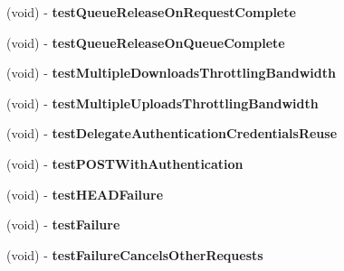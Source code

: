 \begin{DoxyCompactItemize}
\item 
\hypertarget{interface_a_s_i_network_queue_tests_a6ebc6405b8f6639be717def3dcbcd617}{
(void) -\/ {\bfseries test\-Queue\-Release\-On\-Request\-Complete}}
\label{interface_a_s_i_network_queue_tests_a6ebc6405b8f6639be717def3dcbcd617}

\item 
\hypertarget{interface_a_s_i_network_queue_tests_a8367da7729b914e691602cbfbb0cd4d6}{
(void) -\/ {\bfseries test\-Queue\-Release\-On\-Queue\-Complete}}
\label{interface_a_s_i_network_queue_tests_a8367da7729b914e691602cbfbb0cd4d6}

\item 
\hypertarget{interface_a_s_i_network_queue_tests_afecabb41732addf7e0b63960536af284}{
(void) -\/ {\bfseries test\-Multiple\-Downloads\-Throttling\-Bandwidth}}
\label{interface_a_s_i_network_queue_tests_afecabb41732addf7e0b63960536af284}

\item 
\hypertarget{interface_a_s_i_network_queue_tests_a3c936cbdc4d5d95c086acccc6b61a277}{
(void) -\/ {\bfseries test\-Multiple\-Uploads\-Throttling\-Bandwidth}}
\label{interface_a_s_i_network_queue_tests_a3c936cbdc4d5d95c086acccc6b61a277}

\item 
\hypertarget{interface_a_s_i_network_queue_tests_ad451f41961e411ca4e0a493564f3782e}{
(void) -\/ {\bfseries test\-Delegate\-Authentication\-Credentials\-Reuse}}
\label{interface_a_s_i_network_queue_tests_ad451f41961e411ca4e0a493564f3782e}

\item 
\hypertarget{interface_a_s_i_network_queue_tests_aa73ecf9606cf1826f4137aef4ff343be}{
(void) -\/ {\bfseries test\-P\-O\-S\-T\-With\-Authentication}}
\label{interface_a_s_i_network_queue_tests_aa73ecf9606cf1826f4137aef4ff343be}

\item 
\hypertarget{interface_a_s_i_network_queue_tests_aa50e545358ffc84eea2a4f61e6d782eb}{
(void) -\/ {\bfseries test\-H\-E\-A\-D\-Failure}}
\label{interface_a_s_i_network_queue_tests_aa50e545358ffc84eea2a4f61e6d782eb}

\item 
\hypertarget{interface_a_s_i_network_queue_tests_a676be0402a758bbd669e8b11f7bb368d}{
(void) -\/ {\bfseries test\-Failure}}
\label{interface_a_s_i_network_queue_tests_a676be0402a758bbd669e8b11f7bb368d}

\item 
\hypertarget{interface_a_s_i_network_queue_tests_a1d3ea45df0ebc0597e234c1a2fa3c35b}{
(void) -\/ {\bfseries test\-Failure\-Cancels\-Other\-Requests}}
\label{interface_a_s_i_network_queue_tests_a1d3ea45df0ebc0597e234c1a2fa3c35b}


\end{DoxyCompactItemize}
